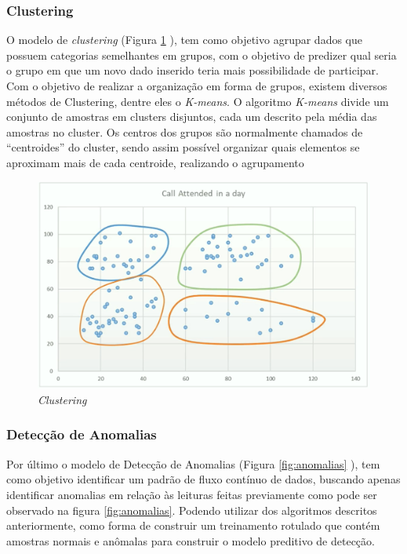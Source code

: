 \documentclass[
	article,			%
	12pt,				%
	oneside,			%
	a4paper,			%
	section=TITLE,		%
	subsection=TITLE,	%
	english,			%
	brazil,				%
	sumario=tradicional
	]{abntex2}
\begin{document}
\subsubsection*{Clustering}
O modelo de \textit{clustering} (Figura \ref{fig:clus} ), tem como objetivo agrupar dados que possuem categorias semelhantes em grupos, com o objetivo de predizer qual seria o grupo em que um novo dado inserido teria mais possibilidade de participar. Com o objetivo de realizar a organização em forma de grupos, existem diversos métodos de Clustering, dentre eles o \textit{K-means}. O algoritmo \textit{K-means} divide um conjunto de amostras em clusters disjuntos, cada um descrito pela média das amostras no cluster. Os centros dos grupos são normalmente chamados de “centroides” do cluster, sendo assim possível organizar quais elementos se aproximam mais de cada centroide, realizando o agrupamento 

\begin{figure}[H]
    \centering
    \includegraphics[scale=0.3]{clustering.png}
    \caption{\textit{Clustering}}
    \label{fig:clus}
\end{figure}

\subsubsection*{Detecção de Anomalias}
Por último o modelo de Detecção de Anomalias (Figura \ref{fig:anomalias} ), tem como objetivo identificar um padrão de fluxo contínuo de dados, buscando apenas identificar anomalias em relação às leituras feitas previamente como pode ser observado na figura \ref{fig:anomalias}. Podendo utilizar dos algoritmos descritos anteriormente, como forma de construir um treinamento rotulado que contém amostras normais e anômalas para construir o modelo preditivo de detecção.
\end{document}
